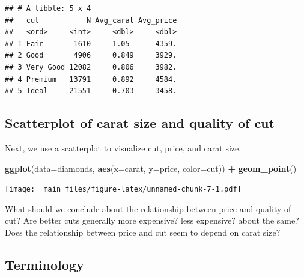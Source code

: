 \documentclass[]{book}
\newenvironment{Shaded}{\begin{snugshade}}{\end{snugshade}}
\newcommand{\KeywordTok}[1]{\textcolor[rgb]{0.13,0.29,0.53}{\textbf{#1}}}
\newcommand{\DataTypeTok}[1]{\textcolor[rgb]{0.13,0.29,0.53}{#1}}
\newcommand{\StringTok}[1]{\textcolor[rgb]{0.31,0.60,0.02}{#1}}
\newcommand{\OperatorTok}[1]{\textcolor[rgb]{0.81,0.36,0.00}{\textbf{#1}}}
\newcommand{\NormalTok}[1]{#1}
\begin{document}
\begin{Shaded}
\end{Shaded}

\begin{verbatim}
## # A tibble: 5 x 4
##   cut           N Avg_carat Avg_price
##   <ord>     <int>     <dbl>     <dbl>
## 1 Fair       1610     1.05      4359.
## 2 Good       4906     0.849     3929.
## 3 Very Good 12082     0.806     3982.
## 4 Premium   13791     0.892     4584.
## 5 Ideal     21551     0.703     3458.
\end{verbatim}

\subsection{Scatterplot of carat size and quality of
cut}\label{scatterplot-of-carat-size-and-quality-of-cut}

Next, we use a scatterplot to visualize cut, price, and carat size.

\begin{Shaded}
\begin{Highlighting}[]
\KeywordTok{ggplot}\NormalTok{(}\DataTypeTok{data=}\NormalTok{diamonds, }\KeywordTok{aes}\NormalTok{(}\DataTypeTok{x=}\NormalTok{carat, }\DataTypeTok{y=}\NormalTok{price, }\DataTypeTok{color=}\NormalTok{cut)) }\OperatorTok{+}\StringTok{ }\KeywordTok{geom_point}\NormalTok{()}
\end{Highlighting}
\end{Shaded}

\texttt{[image: \_main\_files/figure-latex/unnamed-chunk-7-1.pdf]}

What should we conclude about the relationship between price and quality
of cut? Are better cuts generally more expensive? less expensive? about
the same? Does the relationship between price and cut seem to depend on
carat size?

\subsection{Terminology}\label{terminology}
\end{document}
